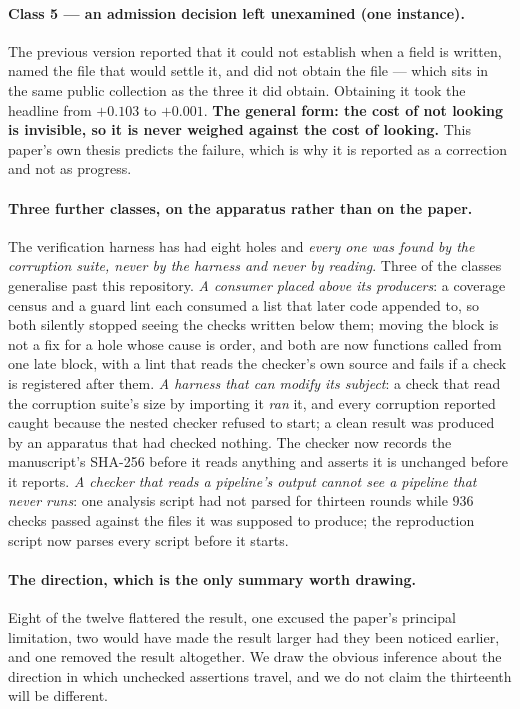 \documentclass[preprint,12pt]{elsarticle}
\begin{document}
\paragraph{Class 5 --- an admission decision left unexamined (one
instance).} The previous version reported that it could not establish when a
field is written, named the file that would settle it, and did not obtain the
file --- which sits in the same public collection as the three it did obtain.
Obtaining it took the headline from $+0.103$ to $+0.001$. \textbf{The general
form: the cost of not looking is invisible, so it is never weighed against the
cost of looking.} This paper's own thesis predicts the failure, which is why
it is reported as a correction and not as progress.

\paragraph{Three further classes, on the apparatus rather than on the paper.}
The verification harness has had eight holes and \emph{every one was found by
the corruption suite, never by the harness and never by reading}. Three of the
classes generalise past this repository. \emph{A consumer placed above its
producers}: a coverage census and a guard lint each consumed a list that later
code appended to, so both silently stopped seeing the checks written below
them; moving the block is not a fix for a hole whose cause is order, and both
are now functions called from one late block, with a lint that reads the
checker's own source and fails if a check is registered after them.
\emph{A harness that can modify its subject}: a check that read the corruption
suite's size by importing it \emph{ran} it, and every corruption reported
caught because the nested checker refused to start; a clean result was
produced by an apparatus that had checked nothing. The checker now records the
manuscript's SHA-256 before it reads anything and asserts it is unchanged
before it reports. \emph{A checker that reads a pipeline's output cannot see a
pipeline that never runs}: one analysis script had not parsed for thirteen
rounds while $936$ checks passed against the files it was supposed to
produce; the reproduction script now parses every script before it starts.

\paragraph{The direction, which is the only summary worth drawing.} Eight of
the twelve flattered the result, one excused the paper's principal limitation,
two would have made the result larger had they been noticed earlier, and one
removed the result altogether. We draw the obvious inference about the
direction in which unchecked assertions travel, and we do not claim the
thirteenth will be different.
\end{document}
